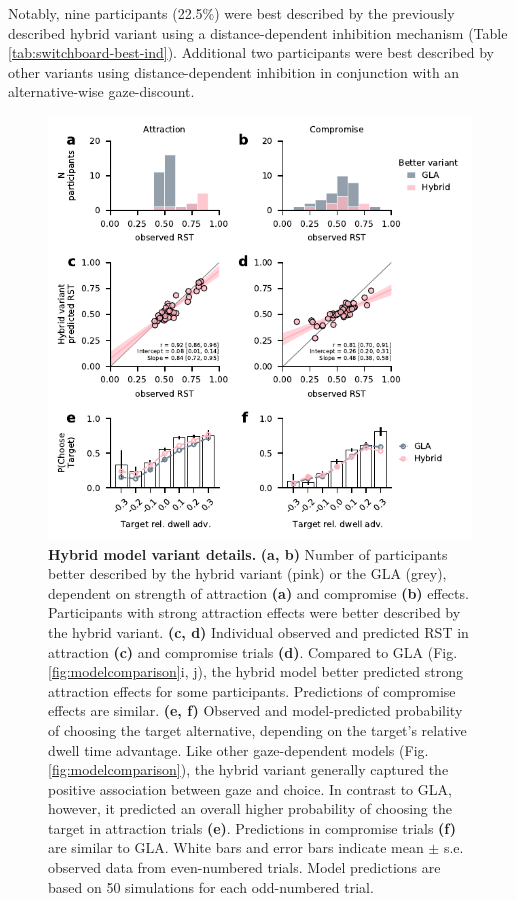 \documentclass[11pt, a4paper]{article}
\begin{document}
Notably, nine participants (22.5\%) were best described by the previously described hybrid variant using a distance-dependent inhibition mechanism (Table \ref{tab:switchboard-best-ind}). Additional two participants were best described by other variants using distance-dependent inhibition in conjunction with an alternative-wise gaze-discount.

\begin{figure}
\centering
\includegraphics[scale=1]{../figures/5-hybrid-variant.pdf}
\caption{\textbf{Hybrid model variant details.} \textbf{(a, b)} Number of participants better described by the hybrid variant (pink) or the GLA (grey), dependent on strength of attraction \textbf{(a)} and compromise \textbf{(b)} effects. Participants with strong attraction effects were better described by the hybrid variant. \textbf{(c, d)} Individual observed and predicted RST in attraction \textbf{(c)} and compromise trials \textbf{(d)}. Compared to GLA (Fig. \ref{fig:modelcomparison}i, j), the hybrid model better predicted strong attraction effects for some participants. Predictions of compromise effects are similar. \textbf{(e, f)} Observed and model-predicted probability of choosing the target alternative, depending on the target’s relative dwell time advantage. Like other gaze-dependent models (Fig. \ref{fig:modelcomparison}), the hybrid variant generally captured the positive association between gaze and choice. In contrast to GLA, however, it predicted an overall higher probability of choosing the target in attraction trials \textbf{(e)}. Predictions in compromise trials \textbf{(f)} are similar to GLA. White bars and error bars indicate mean $\pm$ s.e. observed data from even-numbered trials. Model predictions are based on 50 simulations for each odd-numbered trial.}
\label{fig:hybrid}
\end{figure}
\end{document}

